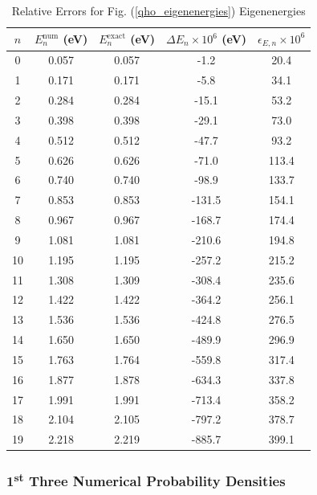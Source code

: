 \begin{table}[h]
\begin{center}
    \begin{tabular}{|c|c|c|c|c|}
        \hline
        $n$ & $E_n^\text{num}$ (eV) & $E_n^\text{exact}$ (eV) & $\Delta E_n\times 10^{6}$ (eV) & $\epsilon_{E,n}\times 10^{6}$ \\ \hline
    	0	&	0.057	&	0.057	&	-1.2	&	20.4	\\ \hline
		1	&	0.171	&	0.171	&	-5.8	&	34.1	\\ \hline
		2	&	0.284	&	0.284	&	-15.1	&	53.2	\\ \hline
		3	&	0.398	&	0.398	&	-29.1	&	73.0	\\ \hline
		4	&	0.512	&	0.512	&	-47.7	&	93.2	\\ \hline
		5	&	0.626	&	0.626	&	-71.0	&	113.4	\\ \hline
		6	&	0.740	&	0.740	&	-98.9	&	133.7	\\ \hline
		7	&	0.853	&	0.853	&	-131.5	&	154.1	\\ \hline
		8	&	0.967	&	0.967	&	-168.7	&	174.4	\\ \hline
		9	&	1.081	&	1.081	&	-210.6	&	194.8	\\ \hline
		10	&	1.195	&	1.195	&	-257.2	&	215.2	\\ \hline
		11	&	1.308	&	1.309	&	-308.4	&	235.6	\\ \hline
		12	&	1.422	&	1.422	&	-364.2	&	256.1	\\ \hline
		13	&	1.536	&	1.536	&	-424.8	&	276.5	\\ \hline
		14	&	1.650	&	1.650	&	-489.9	&	296.9	\\ \hline
		15	&	1.763	&	1.764	&	-559.8	&	317.4	\\ \hline
		16	&	1.877	&	1.878	&	-634.3	&	337.8	\\ \hline
		17	&	1.991	&	1.991	&	-713.4	&	358.2	\\ \hline
		18	&	2.104	&	2.105	&	-797.2	&	378.7	\\ \hline
		19	&	2.218	&	2.219	&	-885.7	&	399.1	\\ \hline
    \end{tabular}
\end{center}
\caption{Relative Errors for Fig. (\ref{qho_eigenenergies}) Eigenenergies}
\label{qho_relative_errors}
\end{table}

\newpage

\subsubsection{1\textsuperscript{st} Three Numerical Probability Densities}

